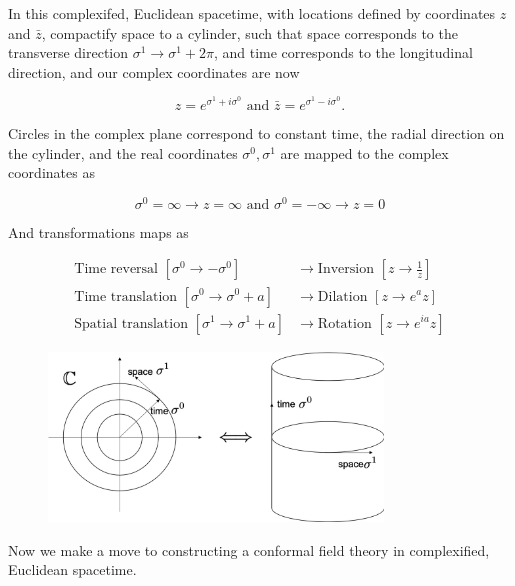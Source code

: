 \noindent In this complexifed, Euclidean spacetime, with locations defined by coordinates $z$ and $\bar{z}$, compactify space to a cylinder, such that space corresponds to the transverse direction $\sigma^1 \rightarrow \sigma^1 + 2\pi$, and time corresponds to the longitudinal direction, and our complex coordinates are now

\begin{equation}
z = e^{\sigma^1 + i \sigma^0} \text{ and } \bar{z} = e^{\sigma^1 - i \sigma^0}.
\end{equation}

\noindent Circles in the complex plane correspond to constant time, the radial direction on the cylinder, and the real coordinates $\sigma^0, \sigma^1$ are mapped to the complex coordinates as

\begin{equation}
\sigma^0 = \infty \rightarrow z = \infty \text{ and  } \sigma^0 = -\infty \rightarrow z=0
\end{equation}

\noindent And transformations maps as

\begin{align}
\text{Time reversal } [\sigma^0 \rightarrow -\sigma^0] &\rightarrow \text{Inversion } [z \rightarrow \frac{1}{z}] \\
\text{Time translation } [\sigma^0 \rightarrow \sigma^0 + a] &\rightarrow \text{Dilation } [z \rightarrow e^a z] \\
\text{Spatial translation } [\sigma^1 \rightarrow \sigma^1 + a] &\rightarrow \text{Rotation } [z \rightarrow e^{ia} z] 
\end{align}

\begin{figure}[H]
	\centering
	\includegraphics[width=3.5in]{images/radial_quantization.png} 
\end{figure} 

\noindent Now we make a move to constructing a conformal field theory in complexified, Euclidean spacetime. \\

